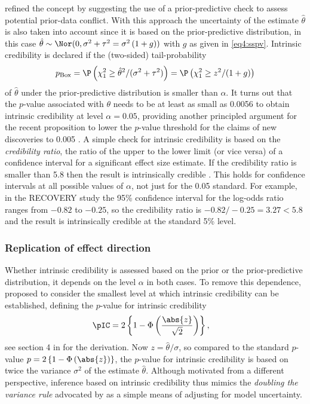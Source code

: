 \citet{Held2019a} refined the concept by suggesting the use of a
prior-predictive check \citep{Box1980, Evans2006} to assess potential prior-data
conflict. With this approach the uncertainty of the estimate $\hat{\theta}$ is
also taken into account since it is based on the prior-predictive distribution,
in this case $\hat\theta \sim \Nor(0, \sigma^2 + \tau^2=\sigma^2 \, (1+g))$ with
$g$ as given in \eqref{eq4:sspv}. Intrinsic credibility is declared if the
(two-sided) tail-probability
\begin{equation*}
  p_{\text{Box}} = \P\left(\chi^2_1 \geq \hat \theta^2/(\sigma^2+\tau^2)\right) = \P\left(\chi^2_1 \geq z^2/(1+g)\right)
\end{equation*}
of $\hat{\theta}$ under the prior-predictive distribution is smaller than
$\alpha$. It turns out that the $p$-value associated with $\theta$ needs to be
at least as small as 0.0056 to obtain intrinsic credibility at level
$\alpha=0.05$, providing another principled argument for the recent proposition
to lower the $p$-value threshold for the claims of new discoveries to 0.005
\citep{Benjamin2017}. A simple check for intrinsic credibility is based on the
\emph{credibility ratio}, the ratio of the upper to the lower limit (or vice
versa) of a confidence interval for a significant effect size estimate. If the
credibility ratio is smaller than 5.8 then the result is intrinsically credible
\citep{Held2019a}. This holds for confidence intervals at all possible values of
$\alpha$, not just for the 0.05 standard. For example, in the RECOVERY study the
95\% confidence interval for the log-odds ratio ranges from $-0.82$ to $-0.25$,
so the credibility ratio is $-0.82/-0.25 = 3.27 < 5.8$ and the result is
intrinsically credible at the standard 5\% level.


\subsubsection*{Replication of effect direction}

Whether intrinsic credibility is assessed based on the prior or the
prior-predictive distribution, it depends on the level $\alpha$ in both cases.
To remove this dependence, \citet{Held2019a} proposed to consider the
smallest level at which intrinsic credibility can be established, defining the
$p$-value for intrinsic credibility
\begin{align}
  \label{eq4:pic}
  \pIC
  &= 2\left\{1 - \Phi\left(\frac{\abs{z}}{\sqrt{2}}\right)\right\},
\end{align}
see section 4 in \citet{Held2019a} for the derivation. Now
$z=\hat \theta/\sigma$, so compared to the standard $p$-value
$p=2\left\{1 - \Phi\left(\abs{z}\right)\right\}$, the $p$-value for intrinsic
credibility is based on twice the variance $\sigma^2$ of the estimate
$\hat{\theta}$. Although motivated from a different perspective, inference based
on intrinsic credibility thus mimics the \emph{doubling the variance rule}
advocated by \citet{Copas2005} as a simple means of adjusting for model
uncertainty.

